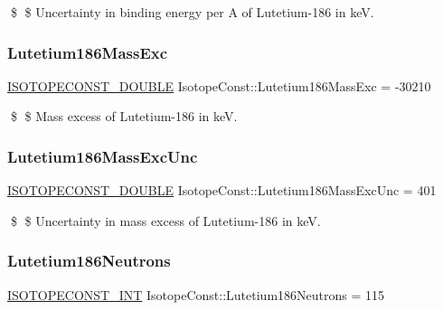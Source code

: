 \$ \$ Uncertainty in binding energy per A of Lutetium-\/186 in keV. \mbox{\label{group___isotope_const-_lutetium-_lu186_ga6c342c573c749494b54d266f971c7a14}} 
\subsubsection{\texorpdfstring{Lutetium186\+Mass\+Exc}{Lutetium186MassExc}}
{\footnotesize\ttfamily \mbox{\hyperlink{group___isotope_const-_macros_ga8f45a7272ce02c0b4c65c44636ed719a}{I\+S\+O\+T\+O\+P\+E\+C\+O\+N\+S\+T\+\_\+\+D\+O\+U\+B\+LE}} Isotope\+Const\+::\+Lutetium186\+Mass\+Exc = -\/30210}

\$ \$ Mass excess of Lutetium-\/186 in keV. \mbox{\label{group___isotope_const-_lutetium-_lu186_gaed4326705034ff63b14eca4700663568}} 
\subsubsection{\texorpdfstring{Lutetium186\+Mass\+Exc\+Unc}{Lutetium186MassExcUnc}}
{\footnotesize\ttfamily \mbox{\hyperlink{group___isotope_const-_macros_ga8f45a7272ce02c0b4c65c44636ed719a}{I\+S\+O\+T\+O\+P\+E\+C\+O\+N\+S\+T\+\_\+\+D\+O\+U\+B\+LE}} Isotope\+Const\+::\+Lutetium186\+Mass\+Exc\+Unc = 401}

\$ \$ Uncertainty in mass excess of Lutetium-\/186 in keV. \mbox{\label{group___isotope_const-_lutetium-_lu186_gac7800626cb28874dd62c596f6a9700ba}} 
\subsubsection{\texorpdfstring{Lutetium186\+Neutrons}{Lutetium186Neutrons}}
{\footnotesize\ttfamily \mbox{\hyperlink{group___isotope_const-_macros_ga5f18360b3e99483a35c32d789e62621c}{I\+S\+O\+T\+O\+P\+E\+C\+O\+N\+S\+T\+\_\+\+I\+NT}} Isotope\+Const\+::\+Lutetium186\+Neutrons = 115}

